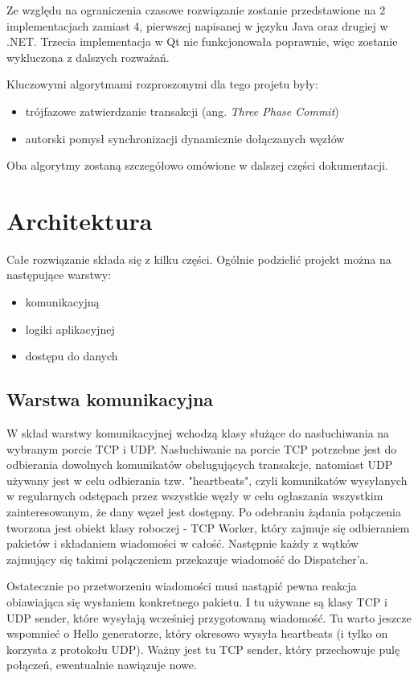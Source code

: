 \documentclass[a4paper, oneside, 11pt]{report}
\begin{document}
Ze względu na ograniczenia czasowe rozwiązanie zostanie przedstawione na 2 implementacjach zamiast 4, pierwszej napisanej w języku Java oraz drugiej w .NET. Trzecia implementacja w Qt nie funkcjonowała poprawnie, więc zostanie wykluczona z dalszych rozważań.

Kluczowymi algorytmami rozproszonymi dla tego projetu były:
\begin{itemize}
	\item trójfazowe zatwierdzanie transakcji (ang. \emph{Three Phase Commit})
	\item autorski pomysł synchronizacji dynamicznie dołączanych węzłów
\end{itemize}
Oba algorytmy zostaną szczegółowo omówione w dalszej części dokumentacji.

\chapter{Architektura}
Całe rozwiązanie składa się z kilku części. Ogólnie podzielić projekt można na następujące warstwy:
\begin{itemize}
	\item komunikacyjną
	\item logiki aplikacyjnej
	\item dostępu do danych
\end{itemize}
\section{Warstwa komunikacyjna}
W skład warstwy komunikacyjnej wchodzą klasy służące do nasłuchiwania na wybranym porcie TCP i UDP. Nasłuchiwanie na porcie TCP potrzebne jest do odbierania dowolnych komunikatów obsługujących transakcje, natomiast UDP używany jest w celu odbierania tzw. "heartbeats", czyli komunikatów wysyłanych w regularnych odstępach przez wszystkie węzły w celu ogłaszania wszystkim zainteresowanym, że dany węzeł jest dostępny. Po odebraniu żądania połączenia tworzona jest obiekt klasy roboczej - TCP Worker, który zajmuje się odbieraniem pakietów i składaniem wiadomości w całość. Następnie każdy z wątków zajmujący się takimi połączeniem przekazuje wiadomość do Dispatcher'a.

Ostatecznie po przetworzeniu wiadomości musi nastąpić pewna reakcja obiawiająca się wysłaniem konkretnego pakietu. I tu używane są klasy TCP i UDP sender, które wysyłają wcześniej przygotowaną wiadomość. Tu warto jeszcze wspomnieć o Hello generatorze, który okresowo wysyła heartbeats (i tylko on korzysta z protokołu UDP). Ważny jest tu TCP sender, który przechowuje pulę połączeń, ewentualnie nawiązuje nowe.
\end{document}
